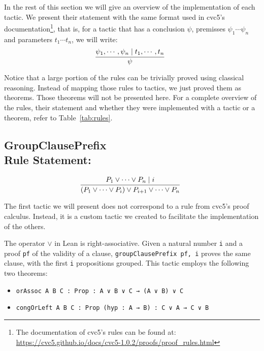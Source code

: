 In the rest of this section we will give an overview of the implementation of each tactic.
We present their statement with the same format used in cvc5's documentation\footnote{The documentation of cvc5's rules can be found at:
  \url{https://cvc5.github.io/docs/cvc5-1.0.2/proofs/proof_rules.html}}, that is,
for a tactic that has a conclusion $\psi$, premisses $\psi_{1} \cdots \psi_{n}$ and
parameters $t_{1} \cdots t_{n}$, we will write:
\[
  \infer[]{\psi}{\psi_{1}, \cdots, \psi_{n} \mid t_{1}, \cdots, t_{n}}
\]

Notice that a large portion of the rules can be trivially proved using classical
reasoning. Instead of mapping those rules to tactics, we just proved them as theorems.
Those theorems will not be presented here. For a complete overview of the rules, their statement and whether they were implemented with a tactic or a
theorem, refer to Table~\ref{tab:rules}.

\subsection*{GroupClausePrefix\\\normalsize{Rule Statement:}}
\[
  \infer[]{(P_{1} \vee \cdots \vee P_{i}) \vee P_{i + 1} \vee \cdots \vee P_{n}}
    {P_{1} \vee \cdots \vee P_{n} \mid i}
\]

The first tactic we will present does not correspond to a rule from cvc5's proof
calculus. Instead, it is a custom tactic we created to facilitate the implementation
of the others.

The operator $\vee$ in Lean is right-associative. Given a natural number \texttt{i} and a proof \texttt{pf}
of the validity of a clause, \texttt{groupClausePrefix pf, i} proves the same clause, with the
first \texttt{i} propositions grouped. This tactic employs the following two theorems:

\begin{itemize}
  \item \texttt{orAssoc {A B C : Prop} : A ∨ B ∨ C → (A ∨ B) ∨ C}
  \item \texttt{congOrLeft {A B C : Prop} (hyp : A → B) : C ∨ A → C ∨ B}
\end{itemize}


